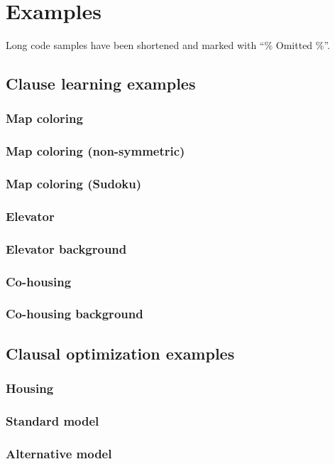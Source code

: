 \chapter{Examples}

Long code samples have been shortened and marked with ``\% Omitted \%''. 

\section{Clause learning examples}
\label{app:cl_examples}
\subsection{Map coloring}


\subsection{Map coloring (non-symmetric)}

\newpage
\subsection{Map coloring (Sudoku)}


\subsection{Elevator}


\subsection{Elevator background}


\subsection{Co-housing}


\subsection{Co-housing background}


\section{Clausal optimization examples}
\label{app:co_examples}
\subsection{Housing}


\subsection{Standard model}


\subsection{Alternative model}
